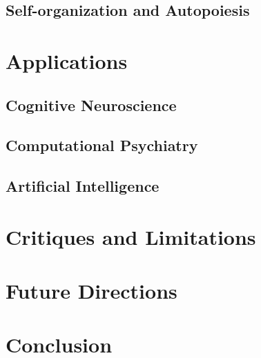 \documentclass[12pt,a4paper]{article}
\begin{document}
\subsection{Self-organization and Autopoiesis}

\section{Applications}
\subsection{Cognitive Neuroscience}

\subsection{Computational Psychiatry}

\subsection{Artificial Intelligence}

\section{Critiques and Limitations}

\section{Future Directions}

\section{Conclusion}



\end{document}
